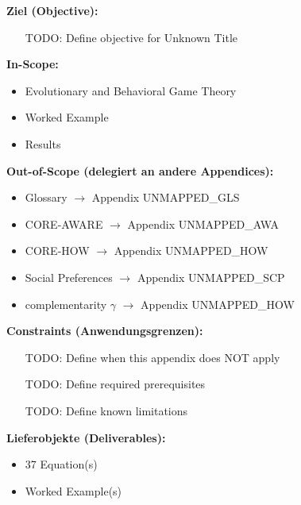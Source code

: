 
\begin{tcolorbox}[
    colback=orange!5!white,
    colframe=orange!75!black,
    title={\textbf{Appendix Scope: Ziel / In-Scope / Out-of-Scope / Constraints}},
    fonttitle=\bfseries
]

\textbf{Ziel (Objective):}
\begin{itemize}[nosep]
    \item [TODO: Define objective for Unknown Title]
\end{itemize}

\textbf{In-Scope:}
\begin{itemize}[nosep]
    \item Evolutionary and Behavioral Game Theory
    \item Worked Example
    \item Results
\end{itemize}

\textbf{Out-of-Scope (delegiert an andere Appendices):}
\begin{itemize}[nosep]
    \item Glossary $\rightarrow$ Appendix UNMAPPED_GLS
    \item CORE-AWARE $\rightarrow$ Appendix UNMAPPED_AWA
    \item CORE-HOW $\rightarrow$ Appendix UNMAPPED_HOW
    \item Social Preferences $\rightarrow$ Appendix UNMAPPED_SCP
    \item complementarity $\gamma$ $\rightarrow$ Appendix UNMAPPED_HOW
\end{itemize}

\textbf{Constraints (Anwendungsgrenzen):}
\begin{itemize}[nosep]
    \item [TODO: Define when this appendix does NOT apply]
    \item [TODO: Define required prerequisites]
    \item [TODO: Define known limitations]
\end{itemize}

\textbf{Lieferobjekte (Deliverables):}
\begin{itemize}[nosep]
    \item 37 Equation(s)
    \item Worked Example(s)
\end{itemize}

\end{tcolorbox}


